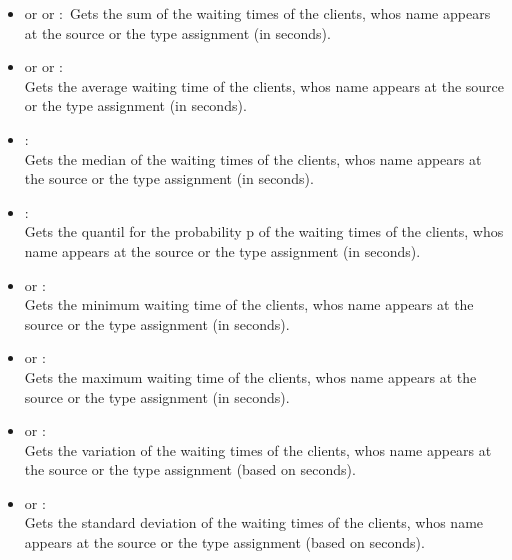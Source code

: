 \begin{itemize}

\item
{} or  or :\
Gets the sum of the waiting times of the clients, whos name appears at the source or the type assignment  (in seconds).

\item
{} or  or :\\
Gets the average waiting time of the clients, whos name appears at the source or the type assignment  (in seconds).

\item
{}:\\
Gets the median of the waiting times of the clients, whos name appears at the source or the type assignment  (in seconds).

\item
{}:\\
Gets the quantil for the probability p of the waiting times of the clients, whos name appears at the source or the type assignment  (in seconds).

\item
{} or :\\
Gets the minimum waiting time of the clients, whos name appears at the source or the type assignment  (in seconds).

\item
{} or :\\
Gets the maximum waiting time of the clients, whos name appears at the source or the type assignment  (in seconds).

\item
{} or :\\
Gets the variation of the waiting times of the clients, whos name appears at the source or the type assignment  (based on seconds).

\item
{} or :\\
Gets the standard deviation of the waiting times of the clients, whos name appears at the source or the type assignment  (based on seconds).


\end{itemize}
